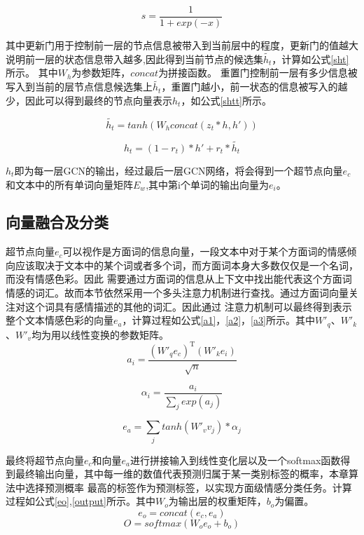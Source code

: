 \begin{equation}\label{sigmoid}
    s = \frac{1}{1+exp(-x)}
\end{equation}

其中更新门用于控制前一层的节点信息被带入到当前层中的程度，更新门的值越大说明前一层的状态信息带入越多,因此得到当前节点的候选集$\tilde{h_t}$，计算如公式\ref{sht}所示。
其中$W_h$为参数矩阵，$concat$为拼接函数。
重置门控制前一层有多少信息被写入到当前的层节点信息候选集上$\tilde{h_t}$，重置门越小，前一状态的信息被写入的越少，因此可以得到最终的节点向量表示$h_t$，如公式\ref{shtt}所示。

\begin{equation}\label{sht}
    \tilde{h_t} = tanh(W_hconcat(z_t*h,h'))
\end{equation}

\begin{equation}\label{shtt}
    h_t = (1-r_t)*h'+r_t*\tilde{h_t}
\end{equation}

$h_t$即为每一层GCN的输出，经过最后一层GCN网络，将会得到一个超节点向量$e_c$和文本中的所有单词向量矩阵$E_w$,其中第i个单词的输出向量为$e_i$。

\subsection{向量融合及分类}
超节点向量$e_c$可以视作是方面词的信息向量，一段文本中对于某个方面词的情感倾向应该取决于文本中的某个词或者多个词，而方面词本身大多数仅仅是一个名词，而没有情感色彩。因此
需要通过方面词的信息从上下文中找出能代表这个方面词情感的词汇。故而本节依然采用一个多头注意力机制进行查找。通过方面词向量关注对这个词具有感情描述的其他的词汇。因此通过
注意力机制可以最终得到表示整个文本情感色彩的向量$e_a$，计算过程如公式\ref{a1}，\ref{a2}，\ref{a3}所示。其中$W'_q$、$W'_k$、$W'_v$均为用以线性变换的参数矩阵。
\begin{equation}\label{a1}
    a_i = \frac{(W'_qe_c)^\mathrm{T}(W'_ke_i)}{\sqrt{n}}
\end{equation}

\begin{equation}\label{a2}
    \alpha_i = \frac{a_i}{\sum_{j}exp(a_j)}
\end{equation}

\begin{equation}\label{a3}
    e_a = \sum_{j}tanh(W'_vv_j)* \alpha_j
\end{equation}

最终将超节点向量$e_c$和向量$e_a$进行拼接输入到线性变化层以及一个softmax函数得到最终输出向量，其中每一维的数值代表预测归属于某一类别标签的概率，本章算法中选择预测概率
最高的标签作为预测标签，以实现方面级情感分类任务。计算过程如公式\ref{eo},\ref{output}所示。其中$W_o$为输出层的权重矩阵，$b_o$为偏置。
\begin{equation}\label{eo}
    e_o = concat(e_c,e_a)
\end{equation}
\begin{equation}\label{output}
    O = softmax(W_oe_o+b_o)
\end{equation}


